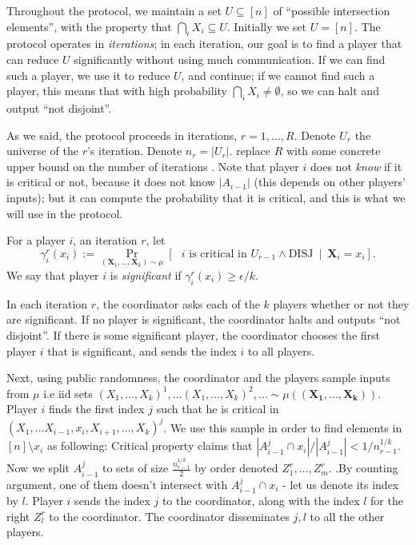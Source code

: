 \documentclass{article}
\newcommand{\coloneq}{:=}
\newcommand{\eps}{\epsilon}
\newcommand{\TODO}[1]{ {\color{red} #1 }}
\newcommand{\given}{\medspace \middle| \medspace}
\newcommand{\rv}[1]{\mathbf{#1}}
\theoremstyle{plain}
\begin{document}
Throughout the protocol, we maintain a set $U \subseteq [n]$ of ``possible intersection elements'', with the property that $\bigcap_i X_i \subseteq U$.
Initially we set $U = [n]$.
The protocol operates in \emph{iterations};
in each iteration, our goal is to find a player that can reduce $U$ significantly without using much communication.
If we can find such a player, we use it to reduce $U$, and continue;
if we cannot find such a player, this means that with high probability $\bigcap_i X_i \neq \emptyset$, so we can halt and output ``not disjoint''.

As we said, the protocol proceeds in iterations, $r = 1,\ldots,R$.
Denote $U_r$ the universe of the $r$'s iteration. Denote $n_r = |U_r|$. \newline
\TODO{replace $R$ with some concrete upper bound on the number of iterations}.
\TODO{Note that player $i$ does not \emph{know} if it is critical or not, because it does not know $|A_{i-1}|$ (this depends on other players' inputs);
but it can compute the probability that it is critical, and this is what we will use in the protocol.}

For a player $i$, an iteration $r$,
let
\begin{equation*}
  \gamma_i^r(x_i) \coloneq \Pr_{(\rv{X}_1,\ldots,\rv{X}_k) \sim \mu}\left[ \text{ $i$ is critical in $U_{r-1}$} \land \text{DISJ} \given \rv{X}_i = x_i \right].
\end{equation*}
We say that player $i$ is \emph{significant} if $\gamma_i^r(x_i) \geq \eps / k$.

In each iteration $r$, the coordinator asks each of the $k$ players whether or not they are significant.
If no player is significant, the coordinator halts and outputs ``not disjoint''.
If there is some significant player, the coordinator chooses the first player $i$ that is significant,
and sends the index $i$ to all players.

Next, using public randomness, the coordinator and the players sample inputs from $\mu$ i.e iid sets $(X_1, \ldots , X_k)^1, \ldots (X_1, \ldots , X_k)^2,\ldots \sim \mu((\rv{X_1}, \ldots , \rv{X_k}))$.
Player $i$ finds the first index $j$ such that he is critical in $(X_1, \ldots X_{i-1}, x_i, X_{i+1}, \ldots , X_k)^j$. \newline
We use this sample in order to find elements in $[n] \setminus x_i$ as following: Critical property claims that $|A_{i-1}^j \cap x_i| / |A_{i-1}^j| < 1/n_{r-1}^{1/k}$. Now we split $A_{i-1}^j$ to sets of size $\frac{n_{r-1}^{1/k}}{2}$ by order denoted $Z^{r}_1, \ldots , Z^{r}_m$. .By counting argument, one of them doesn't intersect with $A_{i-1}^j \cap x_i$ - let us denote its index by $l$. Player $i$ sends the index $j$ to the coordinator, along with the index $l$ for the right $Z^{r}_l$ to the coordinator.
The coordinator disseminates $j, l$ to all the other players.
\end{document}
